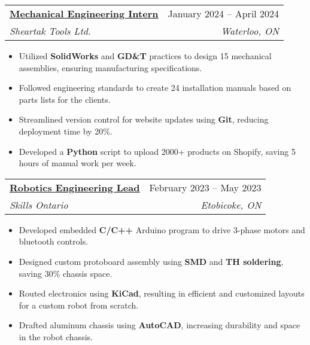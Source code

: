 \documentclass[letterpaper]{article}
\makeatletter
\newcommand{\resumeItem}[1]{
  \item\small{
    {#1 \vspace{-2pt}}
  }
}
\newcommand{\resumeSubheading}[4]{
  \vspace{-2pt}\item
    \begin{tabular*}{0.97\textwidth}[t]{l@{\extracolsep{\fill}}r}
      \textbf{#1} & #2 \\
      \textit{\small#3} & \textit{\small #4} \\
    \end{tabular*}\vspace{-7pt}
}
\newcommand{\resumeItemListStart}{\begin{itemize}}
\newcommand{\resumeItemListEnd}{\end{itemize}\vspace{-5pt}}
\makeatother
\begin{document}
\resumeSubheading
{\href{https://www.gavintranquilino.com/sheartak.html}{\underline{Mechanical Engineering Intern}}}{January 2024 -- April 2024}
{Sheartak Tools Ltd.}{Waterloo, ON}
\resumeItemListStart
\resumeItem{Utilized \textbf{SolidWorks} and \textbf{GD\&T} practices to design 15 mechanical assemblies, ensuring manufacturing specifications.}
\resumeItem{Followed engineering standards to create 24 installation manuals based on parts lists for the clients.}
\resumeItem{Streamlined version control for website updates using \textbf{Git}, reducing deployment time by 20\%.}
\resumeItem{Developed a \textbf{Python} script to upload 2000+ products on Shopify, saving 5 hours of manual work per week.}
\resumeItemListEnd

\resumeSubheading
{\href{https://www.gavintranquilino.com/hockey-robot.html}{\underline{Robotics Engineering Lead}}}{February 2023 -- May 2023}
{Skills Ontario}{Etobicoke, ON}
\resumeItemListStart
\resumeItem{Developed embedded \textbf{C/C++} Arduino program to drive 3-phase motors and bluetooth controls.}
\resumeItem{Designed custom protoboard assembly using \textbf{SMD} and \textbf{TH soldering}, saving 30\% chassis space.}
\resumeItem{Routed electronics using \textbf{KiCad}, resulting in efficient and customized layouts for a custom robot from scratch.}
\resumeItem{Drafted aluminum chassis using \textbf{AutoCAD}, increasing durability and space in the robot chassis.}
\resumeItemListEnd
\end{document}

